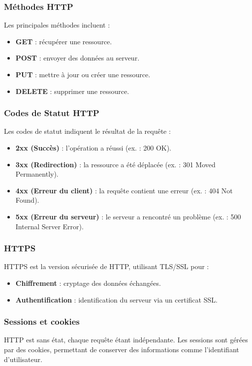 \subsubsection{Méthodes HTTP}
Les principales méthodes incluent :
\begin{itemize}
	\item \textbf{GET} : récupérer une ressource.
	\item \textbf{POST} : envoyer des données au serveur.
	\item \textbf{PUT} : mettre à jour ou créer une ressource.
	\item \textbf{DELETE} : supprimer une ressource.
\end{itemize}

\subsubsection{Codes de Statut HTTP}
Les codes de statut indiquent le résultat de la requête :
\begin{itemize}
	\item \textbf{2xx (Succès)} : l'opération a réussi (ex. : 200 OK).
	\item \textbf{3xx (Redirection)} : la ressource a été déplacée (ex. : 301 Moved Permanently).
	\item \textbf{4xx (Erreur du client)} : la requête contient une erreur (ex. : 404 Not Found).
	\item \textbf{5xx (Erreur du serveur)} : le serveur a rencontré un problème (ex. : 500 Internal Server Error).
\end{itemize}

\subsubsection{HTTPS}
HTTPS est la version sécurisée de HTTP, utilisant TLS/SSL pour :
\begin{itemize}
	\item \textbf{Chiffrement} : cryptage des données échangées.
	\item \textbf{Authentification} : identification du serveur via un certificat SSL.
\end{itemize}

\subsubsection{Sessions et cookies}
HTTP est sans état, chaque requête étant indépendante. Les sessions sont gérées par des cookies, permettant de conserver des informations comme l'identifiant d'utilisateur.

